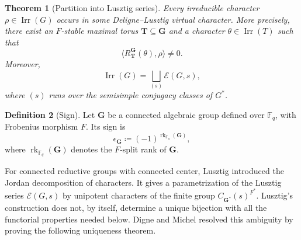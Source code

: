 \documentclass{amsart}
\theoremstyle{plain}
\numberwithin{equation}{section}
\newtheorem{theorem}{Theorem}[section]
\theoremstyle{definition}
\newtheorem{definition}[theorem]{Definition}
\newcommand{\cE}{\mathcal{E}}
\newcommand{\Irr}{\operatorname{Irr}}
\newcommand{\fq}{\mathbb{F}_{q}}
\newcommand{\bG}{\mathbf{G}}
\newcommand{\bT}{\mathbf{T}}
\begin{document}
\begin{theorem}[Partition into Lusztig series]
Every irreducible character \(\rho\in\Irr(G)\) occurs in some
Deligne--Lusztig virtual character.  More precisely, there exist an
\(F\)-stable maximal torus \(\bT\subseteq\bG\) and a character
\(\theta\in\Irr(T)\) such that
\[
\langle R_{\bT}^{\bG}(\theta),\rho\rangle\neq 0.
\]
Moreover,
\[
\Irr(G)=\bigsqcup_{(s)}\cE(G,s),
\]
where \((s)\) runs over the semisimple conjugacy classes of \(G^*\).
\end{theorem}

\begin{definition}[Sign]
Let \(\bG\) be a connected algebraic group defined over \(\fq\), with
Frobenius morphism \(F\).  Its sign is
\[
\epsilon_{\bG}\coloneqq (-1)^{\operatorname{rk}_{\fq}(\bG)},
\]
where \(\operatorname{rk}_{\fq}(\bG)\) denotes the \(F\)-split rank of \(\bG\).
\end{definition}

For connected reductive groups with connected center, Lusztig
\cite{Lus84} introduced the Jordan decomposition of characters.  It gives a
parametrization of the Lusztig series \(\cE(G,s)\) by unipotent characters of
the finite group \(C_{\bG^*}(s)^{F^*}\).  Lusztig's construction does not, by
itself, determine a unique bijection with all the functorial properties needed
below.  Digne and Michel resolved this ambiguity by proving the following
uniqueness theorem.
\end{document}

